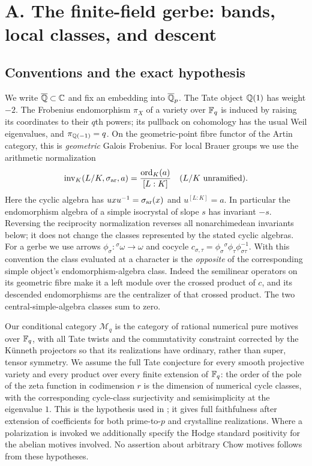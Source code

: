 \section{A. The finite-field gerbe: bands, local classes, and descent}
\label{sec:A}

\subsection{Conventions and the exact hypothesis}
We write $\overline{\mathbb Q}\subset\mathbb C$ and fix an embedding into
$\overline{\mathbb Q}_p$. The Tate object $\mathbb Q(1)$ has weight $-2$.
The Frobenius endomorphism $\pi_X$ of a variety over $\mathbb F_q$ is induced
by raising its coordinates to their $q$th powers; its pullback on cohomology
has the usual Weil eigenvalues, and $\pi_{\mathbb Q(-1)}=q$.
On the geometric-point fibre functor of the Artin category, this is
\emph{geometric} Galois Frobenius. For local Brauer groups we use the
arithmetic normalization
\[
 \operatorname{inv}_K(L/K,\sigma_{\rm ar},a)
       =\frac{\operatorname{ord}_K(a)}{[L:K]}
 \quad(L/K\text{ unramified}).
\]
Here the cyclic algebra has $uxu^{-1}=\sigma_{\rm ar}(x)$ and
$u^{[L:K]}=a$. In particular the endomorphism algebra of a simple
isocrystal of slope $s$ has invariant $-s$. Reversing the reciprocity
normalization reverses all nonarchimedean invariants below; it does not
change the classes represented by the stated cyclic algebras.
For a gerbe we use arrows $\phi_\sigma:{}^\sigma\omega\to\omega$
and cocycle $c_{\sigma,\tau}=\phi_\sigma{}^\sigma\phi_\tau
\phi_{\sigma\tau}^{-1}$. With this convention the class evaluated
at a character is the \emph{opposite} of the corresponding simple
object's endomorphism-algebra class. Indeed the semilinear operators
on its geometric fibre make it a left module over the crossed product
of $c$, and its descended endomorphisms are the centralizer of that
crossed product. The two central-simple-algebra classes sum to zero.

Our conditional category $\mathcal M_q$ is the category of rational
numerical pure motives over $\mathbb F_q$, with all Tate twists and the
commutativity constraint corrected by the K\"unneth projectors so that
its realizations have ordinary, rather than super, tensor symmetry.
We assume the full Tate conjecture for every smooth projective variety
and every product over every finite extension of $\mathbb F_q$: the order of
the pole of the zeta function in codimension $r$ is the dimension of
numerical cycle classes, with the corresponding cycle-class
surjectivity and semisimplicity at the eigenvalue $1$. This is the
hypothesis used in \citet[\S1, especially Propositions 1.15 and
1.17]{AMilne1994}; it gives full faithfulness after extension of
coefficients for both prime-to-$p$ and crystalline realizations.
Where a polarization is invoked we additionally specify the Hodge
standard positivity for the abelian motives involved. No assertion
about arbitrary Chow motives follows from these hypotheses.

